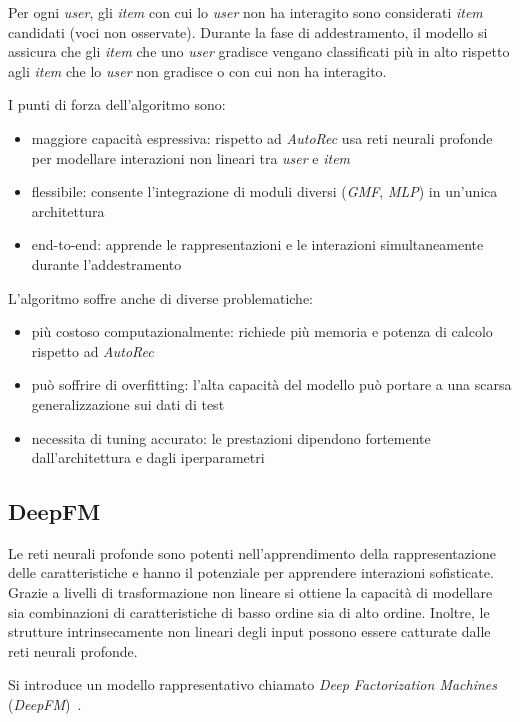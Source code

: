Per ogni \textit{user}, gli \textit{item} con cui lo \textit{user} non ha interagito sono considerati \textit{item} candidati (voci non osservate). Durante la fase di addestramento, il modello si assicura che gli \textit{item} che uno \textit{user} gradisce vengano classificati più in alto rispetto agli \textit{item} che lo \textit{user} non gradisce o con cui non ha interagito.

I punti di forza dell'algoritmo sono:

\begin{itemize}
  \item maggiore capacità espressiva: rispetto ad \textit{AutoRec} usa reti neurali profonde per modellare interazioni non lineari tra \textit{user} e \textit{item}
  \item flessibile: consente l'integrazione di moduli diversi (\textit{GMF}, \textit{MLP}) in un'unica architettura
  \item end-to-end: apprende le rappresentazioni e le interazioni simultaneamente durante l'addestramento
\end{itemize}

L'algoritmo soffre anche di diverse problematiche:

\begin{itemize}
  \item più costoso computazionalmente: richiede più memoria e potenza di calcolo rispetto ad \textit{AutoRec}
  \item può soffrire di overfitting: l'alta capacità del modello può portare a una scarsa generalizzazione sui dati di test
  \item necessita di tuning accurato: le prestazioni dipendono fortemente dall'architettura e dagli iperparametri
\end{itemize}

\subsection{DeepFM}

Le reti neurali profonde sono potenti nell’apprendimento della rappresentazione delle caratteristiche e hanno il potenziale per apprendere interazioni sofisticate. Grazie a livelli di trasformazione non lineare si ottiene la capacità di modellare sia combinazioni di caratteristiche di basso ordine sia di alto ordine. Inoltre, le strutture intrinsecamente non lineari degli input possono essere catturate dalle reti neurali profonde. 

Si introduce un modello rappresentativo chiamato \textit{Deep Factorization Machines} (\textit{DeepFM})~\cite{DeepFM}.

